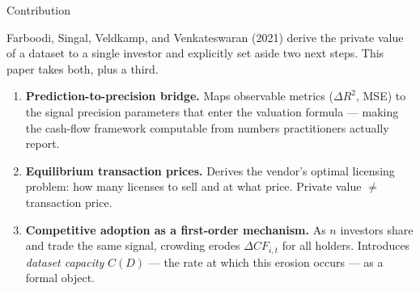 \documentclass[12pt, aspectratio=169]{beamer}
\begin{document}
\begin{frame}{Contribution}

\small
Farboodi, Singal, Veldkamp, and Venkateswaran (2021) derive the private value
of a dataset to a single investor and explicitly set aside two next steps.
This paper takes both, plus a third.

\smallskip
\begin{enumerate}\setlength\itemsep{7pt}
  \item \textbf{Prediction-to-precision bridge.}
        Maps observable metrics ($\Delta R^2$, MSE) to the signal precision
        parameters that enter the valuation formula --- making the cash-flow
        framework computable from numbers practitioners actually report.

  \item \textbf{Equilibrium transaction prices.}
        Derives the vendor's optimal licensing problem: how many licenses to
        sell and at what price. Private value $\neq$ transaction price.

  \item \textbf{Competitive adoption as a first-order mechanism.}
        As $n$ investors share and trade the same signal, crowding erodes
        $\Delta CF_{i,t}$ for all holders. Introduces \emph{dataset capacity}
        $C(D)$ --- the rate at which this erosion occurs --- as a formal object.
\end{enumerate}

\end{frame}
\end{document}
